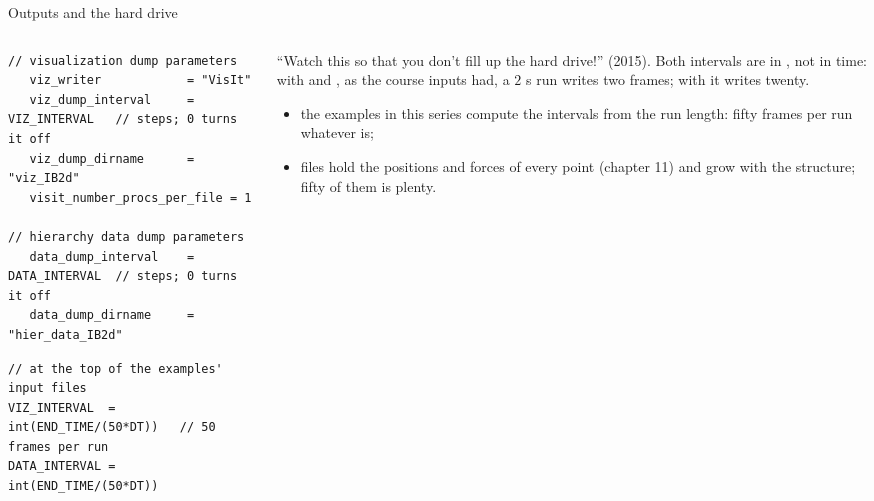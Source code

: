 \documentclass[aspectratio=169,11pt]{beamer}
\begin{document}
\begin{frame}[fragile]{Outputs and the hard drive}
\label{fr:outputs}
\begin{columns}[T,onlytextwidth]
\begin{column}{0.5\textwidth}
\begin{lstlisting}[style=inputtiny]
// visualization dump parameters
   viz_writer            = "VisIt"
   viz_dump_interval     = VIZ_INTERVAL   // steps; 0 turns it off
   viz_dump_dirname      = "viz_IB2d"
   visit_number_procs_per_file = 1

// hierarchy data dump parameters
   data_dump_interval    = DATA_INTERVAL  // steps; 0 turns it off
   data_dump_dirname     = "hier_data_IB2d"
\end{lstlisting}
\begin{lstlisting}[style=inputtiny]
// at the top of the examples' input files
VIZ_INTERVAL  = int(END_TIME/(50*DT))   // 50 frames per run
DATA_INTERVAL = int(END_TIME/(50*DT))
\end{lstlisting}
\end{column}
\begin{column}{0.48\textwidth}
\small ``Watch this so that you don't fill up the hard drive!'' (2015). Both intervals are in , not in time: with  and , as the course inputs had, a $2$ s run writes two frames; with  it writes twenty.
\begin{itemize}
  \item the examples in this series compute the intervals from the run length: fifty frames per run whatever  is;
  \item {} files hold the positions and forces of every point (chapter 11) and grow with the structure; fifty of them is plenty.
\end{itemize}
\end{column}
\end{columns}
\end{frame}
\end{document}
